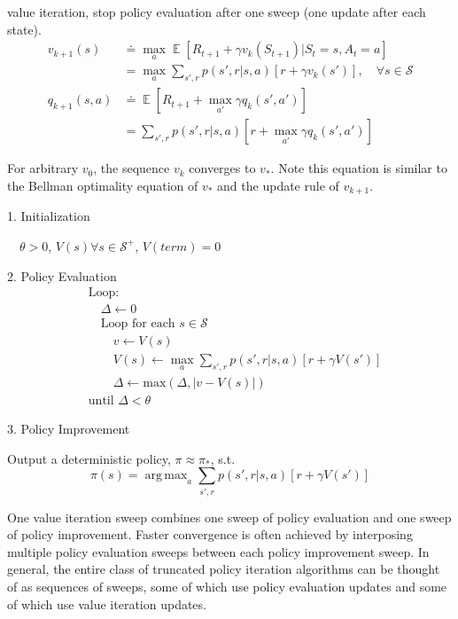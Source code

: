 \documentclass[lang=en,mode=geye,device=normal,color=blue,14pt]{elegantnote}
\DeclareMathOperator*{\E}{\mathbb{E}}
\DeclareMathOperator*{\1}{\mathbbm{1}}
\DeclareMathOperator*{\argmax}{arg\,max}
\begin{document}
\begin{definition}
value iteration, stop policy evaluation after one sweep (one update after each state).
\begin{align*}
v_{k+1}(s) & \doteq \max_a \E [R_{t+1}+\gamma v_k(S_{t+1})|S_t = s, A_t = a]\\
& = \max_a \sum_{s',r} p(s',r|s,a)[r+\gamma v_k (s')],\quad \forall s \in \mathcal{S} \\
q_{k+1}(s,a) & \doteq \E[R_{t+1} + \max_{a'} \gamma q_k (s', a')] \\
& = \sum_{s',r} p(s',r|s,a)[r+\max_{a'} \gamma q_k (s',a')]
\end{align*}
\end{definition}
For arbitrary $v_0$, the sequence ${v_k}$ converges to $v_*$. Note this equation is similar to the Bellman optimality equation of $v_*$ and the update rule of $v_{k+1}$.

\begin{tcolorbox}[width=\textwidth,title={Value Iteration for estimating $\pi \approx \pi_*$}]
1. Initialization

$\quad\theta > 0$, $V(s) \forall s\in\mathcal{S}^+$, $V(term) = 0$

2. Policy Evaluation
\begin{align*}
&\text{Loop:}\\
&\quad\Delta \leftarrow 0\\
&\quad\text{Loop for each } s \in \mathcal{S}\\
&\quad\quad v \leftarrow V(s)\\
&\quad\quad V(s) \leftarrow \max_a \sum_{s',r} p(s',r|s,a)[r + \gamma V(s')]\\
&\quad\quad \Delta \leftarrow \text{max}(\Delta, |v-V(s)|)\\
&\text{until } \Delta < \theta
\end{align*}

3. Policy Improvement

Output a deterministic policy, $\pi \approx \pi_*$, s.t.
$$\pi(s) = \argmax_a\sum_{s',r}p(s',r|s,a)[r+\gamma V(s')]$$
\end{tcolorbox}

One value iteration sweep combines one sweep of policy evaluation
and one sweep of policy improvement. Faster convergence is often achieved by interposing
multiple policy evaluation sweeps between each policy improvement sweep. In general,
the entire class of truncated policy iteration algorithms can be thought of as sequences
of sweeps, some of which use policy evaluation updates and some of which use value
iteration updates.
\end{document}

